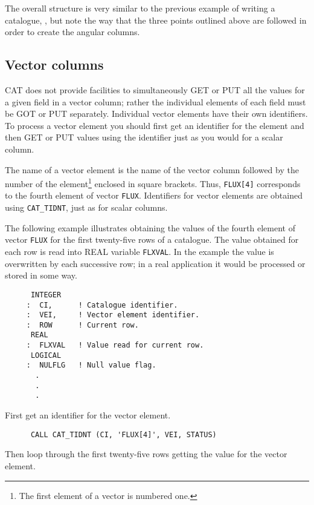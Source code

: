 The overall structure is very similar to the previous example of
writing a catalogue,
, but note the way that the three points
outlined above are followed in order to create the angular columns.


\subsection{Vector columns}

CAT does not provide facilities to simultaneously GET or PUT all the
values for a given field in a vector column; rather the individual
elements of each field must be GOT or PUT separately. Individual
vector elements have their own identifiers. To process a vector element
you should first get an identifier for the element and then GET or
PUT values using the identifier just as you would for a scalar column.

The name of a vector element is the name of the vector column followed
by the number of the element\footnote{The first element of a vector
is numbered one.} enclosed in square brackets. Thus, {\tt FLUX[4]}
corresponds to the fourth element of vector {\tt FLUX}. Identifiers for
vector elements are obtained using {\tt CAT\_TIDNT}, just as for scalar
columns.

The following example illustrates obtaining the values of the fourth
element of vector {\tt FLUX} for the first twenty-five rows of a
catalogue. The value obtained for each row is read into REAL variable
{\tt FLXVAL}. In the example the value is overwritten by each successive
row; in a real application it would be processed or stored in some way.

\begin{verbatim}
      INTEGER
     :  CI,      ! Catalogue identifier.
     :  VEI,     ! Vector element identifier.
     :  ROW      ! Current row.
      REAL
     :  FLXVAL   ! Value read for current row.
      LOGICAL
     :  NULFLG   ! Null value flag.
       .
       .
       .
\end{verbatim}

First get an identifier for the vector element.

\begin{verbatim}
      CALL CAT_TIDNT (CI, 'FLUX[4]', VEI, STATUS)
\end{verbatim}

Then loop through the first twenty-five rows getting the value for the
vector element.

